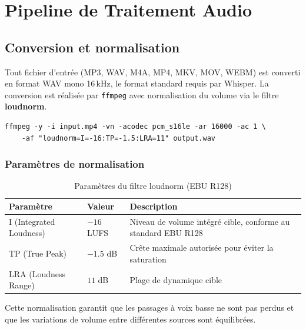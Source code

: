 \documentclass[12pt,a4paper]{report}
\begin{document}
\chapter{Pipeline de Traitement Audio}

\section{Conversion et normalisation}

Tout fichier d'entrée (MP3, WAV, M4A, MP4, MKV, MOV, WEBM) est converti en format WAV mono 16\,kHz, le format standard requis par Whisper. La conversion est réalisée par \texttt{ffmpeg} avec normalisation du volume via le filtre \textbf{loudnorm}.

\begin{lstlisting}[style=bash, title=Commande ffmpeg de conversion]
ffmpeg -y -i input.mp4 -vn -acodec pcm_s16le -ar 16000 -ac 1 \
    -af "loudnorm=I=-16:TP=-1.5:LRA=11" output.wav
\end{lstlisting}

\subsection{Paramètres de normalisation}

\begin{table}[H]
    \centering
    \caption{Paramètres du filtre loudnorm (EBU R128)}
    \label{tab:loudnorm}
    \begin{tabular}{@{} l l p{7cm} @{}}
        \toprule
        \textbf{Paramètre} & \textbf{Valeur} & \textbf{Description} \\
        \midrule
        I (Integrated Loudness) & $-16$ LUFS & Niveau de volume intégré cible, conforme au standard EBU R128 \\
        TP (True Peak) & $-1.5$ dB & Crête maximale autorisée pour éviter la saturation \\
        LRA (Loudness Range) & $11$ dB & Plage de dynamique cible \\
        \bottomrule
    \end{tabular}
\end{table}

Cette normalisation garantit que les passages à voix basse ne sont pas perdus et que les variations de volume entre différentes sources sont équilibrées.
\end{document}
